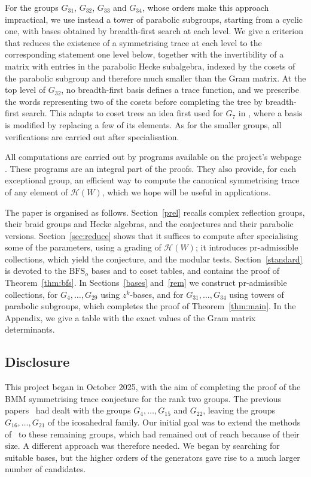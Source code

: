 \documentclass[11pt, reqno]{amsart}
\numberwithin{equation}{section}
\theoremstyle{remark}
\begin{document}
For the groups $G_{31}$, $G_{32}$, $G_{33}$ and $G_{34}$, whose orders
make this approach impractical, we use instead a tower of parabolic
subgroups, starting from a cyclic one, with bases obtained by
breadth-first search at each level. We give a criterion that reduces
the existence of a symmetrising trace at each level to the
corresponding statement one level below, together with the
invertibility of a matrix with entries in the parabolic Hecke
subalgebra, indexed by the cosets of the parabolic subgroup and
therefore much smaller than the Gram matrix.  At the top level of
$G_{32}$, no breadth-first basis defines a trace function, and we
prescribe the words representing two of the cosets before completing
the tree by breadth-first search. This adapts to coset trees an idea
first used for $G_7$ in \cite[\S4.2.4]{BCCK}, where a basis is modified
by replacing a few of its elements. As for the smaller groups, all
verifications are carried out after specialisation.


All computations are carried out by programs available on the
project's webpage \cite{web}. These programs are an integral part of
the proofs. They also provide, for each exceptional group, an efficient
way to compute the canonical symmetrising trace of any element of
$\mathcal H(W)$, which we hope will be useful in applications. 

The paper is organised as follows. Section~\ref{prel} recalls complex reflection
groups, their braid groups and Hecke algebras, and the conjectures and
their parabolic versions. Section~\ref{sec:reduce} shows that it suffices to compute
after specialising some of the parameters, using a grading of
$\mathcal H(W)$; it introduces $\mathrm{pr}$-admissible collections,
which yield the conjecture, and the modular tests. Section~\ref{standard} is devoted
to the $\mathrm{BFS}_o$ bases and to coset tables, and contains the
proof of Theorem~\ref{thm:bfs}. In Sections~\ref{bases} and~\ref{rem} we construct
$\mathrm{pr}$-admissible collections, for $G_4,\dots,G_{29}$ using
$z^k$-bases, and for $G_{31},\dots,G_{34}$ using towers of parabolic
subgroups, which completes the proof of Theorem~\ref{thm:main}.  In the Appendix, we give a table with the exact values of the Gram matrix determinants.



\subsection*{Disclosure}
This project began in October 2025, with the aim of completing the proof of the BMM symmetrising trace conjecture for the rank two groups. The previous papers~\cite{MM10, BCCK, BCC, ChPf1, ChPf} had dealt with the groups $G_4,\ldots,G_{15}$ and $G_{22}$, leaving the groups $G_{16},\ldots,G_{21}$ of the icosahedral family. Our initial goal was to extend the methods of~\cite{ChPf} to these remaining groups, which had remained out of reach because of their size. A different approach was therefore needed. We began by searching for suitable bases, but the higher orders of the generators gave rise to a much larger number of candidates.
\end{document}

